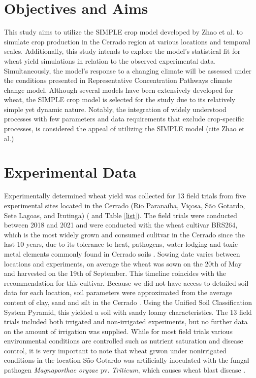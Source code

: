 \documentclass[a4paper,12pt,oneside]{article}
\begin{document}
\section{Objectives and Aims}
\label{sec:org586cfce}
This study aims to utilize the SIMPLE crop model developed by Zhao et al. to simulate crop production in the Cerrado region at various locations and temporal scales. Additionally, this study intends to explore the model’s statistical fit for wheat yield simulations in relation to the observed experimental data. Simultaneously, the model’s response to a changing climate will be assessed under the conditions presented in Representative Concentration Pathways climate change model. Although several models have been extensively developed for wheat, the SIMPLE crop model is selected for the study due to its relatively simple yet dynamic nature. Notably, the integration of widely understood processes with few parameters and data requirements that exclude crop-specific processes, is considered the appeal of utilizing the SIMPLE model (cite Zhao et al.)

\section{Experimental Data}
\label{sec:orgcb8b96e}
Experimentally determined wheat yield was collected for 13 field trials from five experimental sites located in the Cerrado (Rio Paranaíba, Viçosa, São Gotardo, Sete Lagoas, and Itutinga) (\cite{casagrande-2023-new-brazil} and Table \ref{list}). The field trials were conducted between 2018 and 2021 and were conducted with the wheat cultivar BRS264, which is the most widely grown and consumed culitvar in the Cerrado since the last 10 years, due to its tolerance to heat, pathogens, water lodging and toxic metal elements commonly found in Cerrado soils \cite{albrecht-2021-cultiv-trigo}.
Sowing date varies between locations and experiments, on average the wheat was sown on the 20th of May and harvested on the 19th of September. This timeline coincides with the recommendation for this cultivar. Because we did not have access to detailed soil data for each location, soil parameters were approximated from the average content of clay, sand and silt in the Cerrado \cite{lopes-2016-chapt-one}. Using the Unified Soil Classification System Pyramid, this yielded a soil with sandy loamy characteristics. The 13 field trials included both irrigated and non-irrigated experiments, but no further data on the amount of irrigation was supplied. While for most field trials various environmental conditions are controlled such as nutrient saturation and disease control, it is very important to note that wheat grwon under nonirrigated conditions in the location São Gotardo was artificially inoculated with the fungal pathogen \emph{Magnaporthae oryzae} pv. \emph{Triticum}, which causes wheat blast disease \cite{albrecht-2021-cultiv-trigo}.
\end{document}
